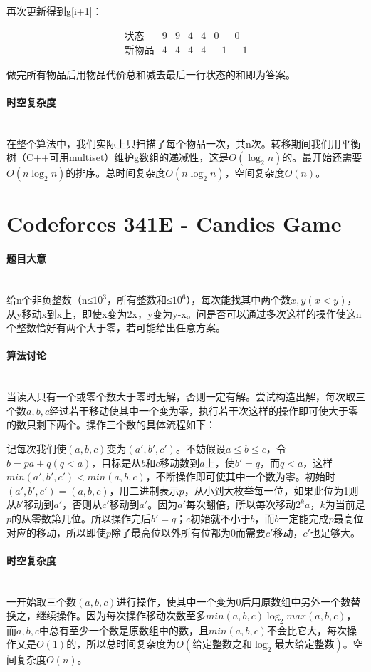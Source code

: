 \documentclass[UTF8]{ctexart}
\newcommand{\myparagraph}[1]{\paragraph{#1}\mbox{}\\}
\theoremstyle{nonumberplain}
\begin{document}
			再次更新得到g[i+1]：
			
			$$\begin{array}{lcccccc}
				\mbox{状态} & 9 & 9 & 4 & 4 & 0 & 0 \\
				\mbox{新物品} & 4 & 4 & 4 & 4 & -1 & -1
			\end{array}$$
			
			做完所有物品后用物品代价总和减去最后一行状态的和即为答案。
		
		\myparagraph{时空复杂度}
		
			在整个算法中，我们实际上只扫描了每个物品一次，共n次。转移期间我们用平衡树（C++可用multiset）维护g数组的递减性，这是$O(\log_2n)$的。最开始还需要$O(n\log_2n)$的排序。总时间复杂度$O(n\log_2n)$，空间复杂度$O(n)$。
	
	\section{Codeforces 341E - Candies Game}
		
		\myparagraph{题目大意}
			
			给n个非负整数（n≤$10^3$，所有整数和≤$10^6$），每次能找其中两个数$x,y(x<y)$，从y移动x到x上，即使x变为2x，y变为y-x。问是否可以通过多次这样的操作使这n个整数恰好有两个大于零，若可能给出任意方案。
			
		\myparagraph{算法讨论}
		
			当读入只有一个或零个数大于零时无解，否则一定有解。尝试构造出解，每次取三个数$a,b,c$经过若干移动使其中一个变为零，执行若干次这样的操作即可使大于零的数只剩下两个。操作三个数的具体流程如下：
			
			记每次我们使$(a,b,c)$变为$(a',b',c')$。不妨假设$a \leq b \leq c$，令$b=pa+q(q<a)$，目标是从$b$和$c$移动数到$a$上，使$b'=q$，而$q<a$，这样$min(a',b',c')<min(a,b,c)$，不断操作即可使其中一个数为零。初始时$(a',b',c')=(a,b,c)$，用二进制表示$p$，从小到大枚举每一位，如果此位为1则从$b'$移动到$a'$，否则从$c'$移动到$a'$。因为$a'$每次翻倍，所以每次移动$2^k a$，$k$为当前是$p$的从零数第几位。所以操作完后$b'=q$；$c$初始就不小于$b$，而$b$一定能完成$p$最高位对应的移动，所以即使$p$除了最高位以外所有位都为0而需要$c'$移动，$c'$也足够大。
		
		\myparagraph{时空复杂度}
		
			一开始取三个数$(a,b,c)$进行操作，使其中一个变为0后用原数组中另外一个数替换之，继续操作。因为每次操作移动次数至多$min(a,b,c)\log_2max(a,b,c)$，而$a,b,c$中总有至少一个数是原数组中的数，且$min(a,b,c)$不会比它大，每次操作又是$O(1)$的，所以总时间复杂度为$O(\mbox{给定整数之和}\log_2\mbox{最大给定整数})$。空间复杂度$O(n)$。
	
\end{document}
